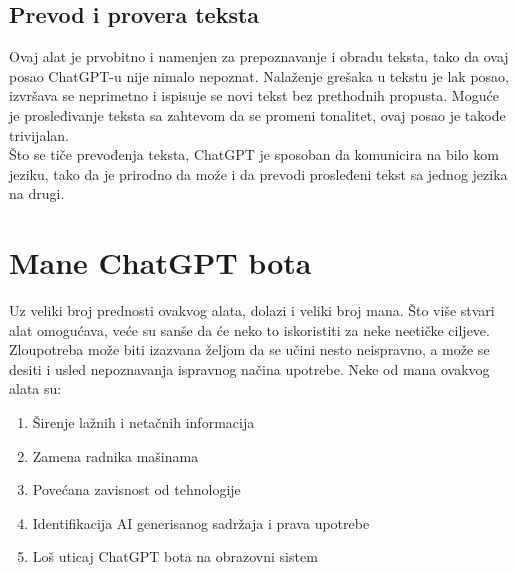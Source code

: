\documentclass[fleqn, 12pt]{article}
\begin{document}
    \subsection{Prevod i provera teksta}
        \begin{text}
            Ovaj alat je prvobitno i namenjen za prepoznavanje i obradu teksta,  tako da ovaj posao ChatGPT-u nije nimalo nepoznat. Nalaženje grešaka u tekstu je lak posao, izvršava se neprimetno i ispisuje se novi tekst bez prethodnih propusta. Moguće je prosleđivanje teksta sa zahtevom da se promeni tonalitet, ovaj posao je takođe trivijalan.
            \\
            Što se tiče prevođenja teksta, ChatGPT je sposoban da komunicira na bilo kom jeziku, tako da je prirodno da može i da prevodi prosleđeni tekst sa jednog jezika na drugi.
        \end{text}
\newpage
\section{Mane ChatGPT bota}
Uz veliki broj prednosti ovakvog alata, dolazi i veliki broj mana. Što više stvari alat omogućava, veće su sanše da će neko to iskoristiti za neke neetičke ciljeve. Zloupotreba može biti izazvana željom da se učini nesto neispravno, a može se desiti i usled nepoznavanja ispravnog načina upotrebe. Neke od mana ovakvog alata su:
\begin{enumerate}
  \item Širenje lažnih i netačnih informacija
  \item Zamena radnika mašinama
  \item Povećana zavisnost od tehnologije
  \item Identifikacija AI generisanog sadržaja i prava upotrebe
  \item Loš uticaj ChatGPT bota na obrazovni sistem
\end{enumerate}
\end{document}
